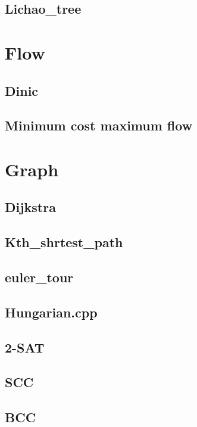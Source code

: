     \subsection{Lichao\_tree}
        

\section{Flow}
    \subsection{Dinic}
        
    \subsection{Minimum cost maximum flow}
        

\section{Graph}
    \subsection{Dijkstra}
        
    \subsection{Kth\_shrtest\_path}
        
    \subsection{euler\_tour}
        
    \subsection{Hungarian.cpp}
        
    \subsection{2-SAT}
        
    \subsection{SCC}
        
    \subsection{BCC}
        
